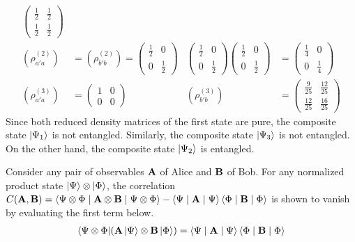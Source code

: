 \begin{answer}
\begin{align*}
\begin{pmatrix}
			\frac{1}{2} & \frac{1}{2} \\
			\frac{1}{2} & \frac{1}{2}
		\end{pmatrix}
		\\ \left(\rho^{(2)}_{a' a}\right) & =
		\left(\rho^{(2)}_{b' b}\right) =
		\begin{pmatrix}
			\frac{1}{2} & 0           \\
			0           & \frac{1}{2}
		\end{pmatrix}
		                               &
		\begin{pmatrix}
			\frac{1}{2} & 0           \\
			0           & \frac{1}{2}
		\end{pmatrix}
		\begin{pmatrix}
			\frac{1}{2} & 0           \\
			0           & \frac{1}{2}
		\end{pmatrix}
		                               & =
		\begin{pmatrix}
			\frac{1}{4} & 0           \\
			0           & \frac{1}{4}
		\end{pmatrix}
		\\ \left(\rho^{(3)}_{a' a}\right) &=
		\begin{pmatrix}
			1 & 0 \\
			0 & 0
		\end{pmatrix}
		                               &
		\left(\rho^{(3)}_{b' b}\right) & =
		\begin{pmatrix}
			\frac{9}{25}  & \frac{12}{25} \\
			\frac{12}{25} & \frac{16}{25}
		\end{pmatrix}
	\end{align*}
	Since both reduced density matrices of the first state are pure, the composite state $\ket{\Psi_1}$ is not entangled.
	Similarly, the composite state $\ket{\Psi_3}$ is not entangled.
	On the other hand, the composite state $\ket{\Psi_2}$ is entangled.
\end{answer}

\begin{answer}
	Consider any pair of observables $\mathbf{A}$ of Alice and $\mathbf{B}$ of Bob.
	For any normalized product state $\ket{\Psi} \otimes \ket{\Phi}$, the correlation $C(\mathbf{A}, \mathbf{B}) = \braket{\Psi \otimes \Phi \mid \mathbf{A} \otimes \mathbf{B} \mid \Psi \otimes \Phi} - \braket{\Psi \mid \mathbf{A} \mid \Psi} \braket{\Phi \mid \mathbf{B} \mid \Phi}$ is shown to vanish by evaluating the first term below.
	\begin{align}
		\bra{\Psi \otimes \Phi} \!\left(\mathbf{A} \ket{\Psi} \otimes \mathbf{B} \ket{\Phi}\right) = \braket{\Psi \mid \mathbf{A} \mid \Psi} \braket{\Phi \mid \mathbf{B} \mid \Phi}
	\end{align}
\end{answer}

